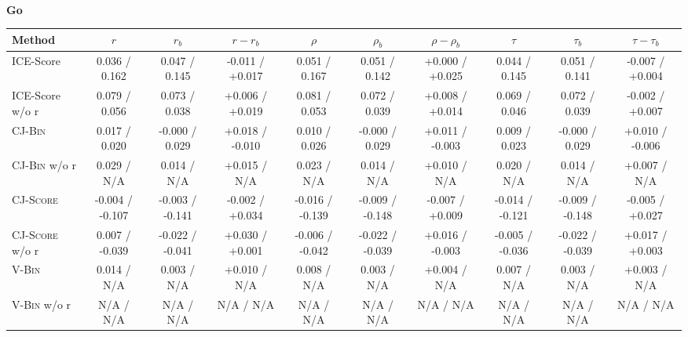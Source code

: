 \begin{table}[t]
\begin{tabular}{@{}l|ccc|ccc|ccc@{}}
        \bottomrule
    \end{tabular}
    \\[7pt]
    {\bf Go}\\
    \begin{tabular}{@{}l|ccc|ccc|ccc@{}}
        \toprule
        Method & $r$ & $r_b$ & $r-r_b$ & $\rho$ & $\rho_b$ & $\rho-\rho_b$ & $\tau$ & $\tau_b$ & $\tau-\tau_b$ \\
        \midrule
        ICE-Score               & 0.036 / 0.162   & 0.047 / 0.145   & -0.011 / +0.017                     & 0.051 / 0.167   & 0.051 / 0.142   & +0.000 / +0.025                     & 0.044 / 0.145   & 0.051 / 0.141   & -0.007 / +0.004                     \\
        ICE-Score w/o r         & 0.079 / 0.056   & 0.073 / 0.038   & +0.006 / +0.019                     & 0.081 / 0.053   & 0.072 / 0.039   & +0.008 / +0.014                     & 0.069 / 0.046   & 0.072 / 0.039   & -0.002 / +0.007                     \\
        \midrule
        \textsc{CJ-Bin}         & 0.017 / 0.020   & -0.000 / 0.029  & +0.018 / -0.010                     & 0.010 / 0.026   & -0.000 / 0.029  & +0.011 / -0.003                     & 0.009 / 0.023   & -0.000 / 0.029  & +0.010 / -0.006                     \\
        \textsc{CJ-Bin} w/o r   & 0.029 / N/A     & 0.014 / N/A     & +0.015 / N/A                        & 0.023 / N/A     & 0.014 / N/A     & +0.010 / N/A                        & 0.020 / N/A     & 0.014 / N/A     & +0.007 / N/A                        \\
        \textsc{CJ-Score}       & -0.004 / -0.107 & -0.003 / -0.141 & -0.002 / +0.034                     & -0.016 / -0.139 & -0.009 / -0.148 & -0.007 / +0.009                     & -0.014 / -0.121 & -0.009 / -0.148 & -0.005 / +0.027                     \\
        \textsc{CJ-Score} w/o r & 0.007 / -0.039  & -0.022 / -0.041 & +0.030 / +0.001                     & -0.006 / -0.042 & -0.022 / -0.039 & +0.016 / -0.003                     & -0.005 / -0.036 & -0.022 / -0.039 & +0.017 / +0.003                     \\
        \midrule
        \textsc{V-Bin}          & 0.014 / N/A     & 0.003 / N/A     & +0.010 / N/A                        & 0.008 / N/A     & 0.003 / N/A     & +0.004 / N/A                        & 0.007 / N/A     & 0.003 / N/A     & +0.003 / N/A                        \\
        \textsc{V-Bin} w/o r    & N/A / N/A       & N/A / N/A       & N/A / N/A                           & N/A / N/A       & N/A / N/A       & N/A / N/A                           & N/A / N/A       & N/A / N/A       & N/A / N/A                           \\

\end{tabular}
\end{table}
